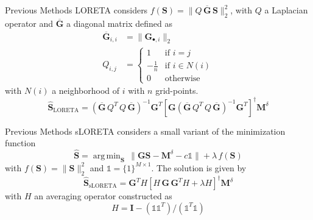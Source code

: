 \documentclass[progressbar=head]{beamer}
\newcommand{\ppar}[1]{ \left( #1 \right) }
\newcommand{\spar}[1]{ \left[ #1 \right] }
\DeclareMathOperator*{\argmin}{arg\,min}
\newcommand{\nnorm}[1]{\lVert #1 \rVert}
\newcommand{\G}{\mathbf{G}}
\newcommand{\id}{\mathbf{I}}
\begin{document}
\begin{frame}{Previous Methods}
LORETA\cite{loreta}  considers 
$f\ppar{\mathbf{S}} = \nnorm{Q\,\overline{\G}\, \mathbf{S}}_2^2$, with $Q$ 
a Laplacian operator and $\overline{\G}$ 
a diagonal matrix
defined as
\begin{align*}
    \overline{\G}_{i,i} &= \nnorm{\G_{\bullet,i}}_2 \\
    Q_{i,j} &=
    \begin{cases}
        1 &\text{if } i=j \\
        -\frac{1}{n} &\text{if } i\in N(i) \\
        0 &\text{otherwise}
    \end{cases}
\end{align*}
with $N(i)$ a neighborhood of $i$ with $n$ grid-points.
%
\begin{equation}
    \hat{\mathbf{S}}_{\text{LORETA}}
    =
    \ppar{\overline{\G}\, Q^T\, Q\,  \overline{\G}}^{-1} \G^T
    \spar{\G \ppar{\overline{\G}\, Q^T\, Q\,  \overline{\G}}^{-1} \G^T}^{\dagger} 
    \mathbf{M}^\delta
\end{equation}

\end{frame}

\begin{frame}{Previous Methods}
sLORETA\cite{sloreta}  considers a small variant of the minimization function
\begin{equation}
    \hat{\mathbf{S}} = \argmin_{\mathbf{S}}\, \nnorm{\G \mathbf{S}-\mathbf{M}^\delta-c \mathbb{1}} + \lambda\, f\ppar{\mathbf{S}}
\end{equation}
with $f\ppar{\mathbf{S}} = \nnorm{\mathbf{S}}_2^2$ and 
$\mathbb{1}=\{1\}^{M\times 1}$.
The solution is given by
\begin{equation}
    \hat{\mathbf{S}}_{\text{sLORETA}}
    =
    \G^T H\spar{H\, \G\, \G^T H+ \lambda H}^{\dagger}
    \mathbf{M}^\delta
\end{equation}
with $H$ an averaging operator constructed as
\begin{equation*}
    H = \id - \ppar{\mathbb{1} \mathbb{1}^T}/\ppar{\mathbb{1}^T \mathbb{1}}
\end{equation*}
\end{frame}
\end{document}
